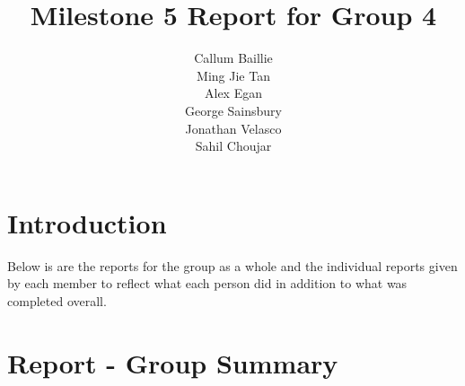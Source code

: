 \documentclass{article}
\begin{document}
\title{\textbf{Milestone 5 Report for Group 4}}\author{Callum Baillie \\ Ming Jie Tan \\ Alex Egan \\ George Sainsbury \\ Jonathan Velasco \\ Sahil Choujar}

\maketitle
\thispagestyle{empty}
\newpage{}

\thispagestyle{empty}
\tableofcontents
\newpage{}

\setcounter{page}{1}
\section{Introduction}

Below is are the reports for the group as a whole and the individual reports given by each member to reflect what each person did in addition to what was completed overall.

\section{Report - Group Summary}
\end{document}
